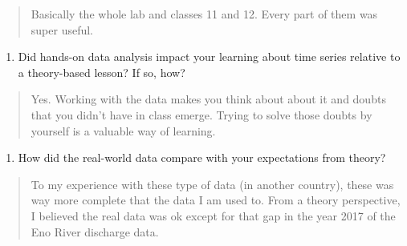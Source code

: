 \documentclass[]{article}
\providecommand{\tightlist}{%
  \setlength{\itemsep}{0pt}\setlength{\parskip}{0pt}}
\begin{document}
\begin{quote}
Basically the whole lab and classes 11 and 12. Every part of them was
super useful.
\end{quote}

\begin{enumerate}
\def\labelenumi{\arabic{enumi}.}
\setcounter{enumi}{16}
\tightlist
\item
  Did hands-on data analysis impact your learning about time series
  relative to a theory-based lesson? If so, how?
\end{enumerate}

\begin{quote}
Yes. Working with the data makes you think about about it and doubts
that you didn't have in class emerge. Trying to solve those doubts by
yourself is a valuable way of learning.
\end{quote}

\begin{enumerate}
\def\labelenumi{\arabic{enumi}.}
\setcounter{enumi}{17}
\tightlist
\item
  How did the real-world data compare with your expectations from
  theory?
\end{enumerate}

\begin{quote}
To my experience with these type of data (in another country), these was
way more complete that the data I am used to. From a theory perspective,
I believed the real data was ok except for that gap in the year 2017 of
the Eno River discharge data.
\end{quote}
\end{document}
